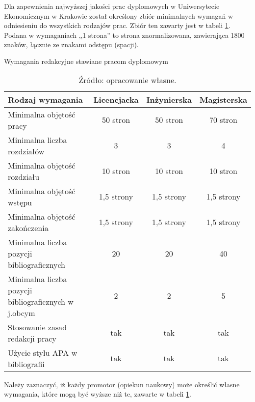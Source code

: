 Dla zapewnienia najwyższej jakości prac dyplomowych w Uniwersytecie Ekonomicznym w Krakowie został określony zbiór minimalnych wymagań w odniesieniu do wszystkich rodzajów prac. Zbiór ten zawarty jest w tabeli \ref{tab:wymagania}. Podana w wymaganiach ,,1 strona'' to strona znormalizowana, zawierająca 1800 znaków, łącznie ze znakami odstępu (spacji). 


\begin{table}[ht]
	\centering
	\caption{Wymagania redakcyjne stawiane pracom dyplomowym}
	\begin{tabularx}{\textwidth}{X c c c}
		\hline
		\textbf{Rodzaj wymagania} & \textbf{Licencjacka} & \textbf{Inżynierska} & \textbf{Magisterska}\\
		\hline
		Minimalna objętość pracy & 50 stron & 50 stron & 70 stron\\
		Minimalna liczba rozdziałów & 3 & 3 & 4\\
		Minimalna objętość rozdziału & 10 stron & 10 stron & 10 stron\\
		Minimalna objętość wstępu & 1,5 strony & 1,5 strony & 1,5 strony\\
		Minimalna objętość zakończenia & 1,5 strony & 1,5 strony & 1,5 strony\\
		Minimalna liczba pozycji bibliograficznych & 20 & 20 & 40\\
		Minimalna liczba pozycji bibliograficznych w j.obcym & 2 & 2 & 5\\
		Stosowanie zasad redakcji pracy & tak & tak & tak\\
		Użycie stylu APA w bibliografii & tak & tak & tak\\
		\hline		
	\end{tabularx}
	\caption*{Źródło: opracowanie własne.}
	\label{tab:wymagania}
\end{table}

Należy zaznaczyć, iż każdy promotor (opiekun naukowy) może określić własne wymagania, które mogą być wyższe niż te, zawarte w tabeli \ref{tab:wymagania}.



